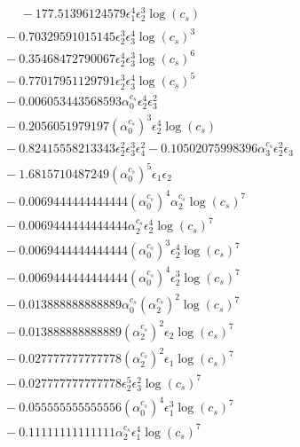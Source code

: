 \documentclass[10pt]{article}
\begin{document}
\begin{align*}
\phantom{F_{s,7}} &\phantom{={}}{}  - 177.51396124579 \epsilon_{1}^{4} \epsilon_{2}^{3} \log{\left(c_{s} \right)} \\
&{}  - 0.70329591015145 \epsilon_{2}^{3} \epsilon_{3}^{4} \log{\left(c_{s} \right)}^{3} \\
&{}  - 0.35468472790067 \epsilon_{2}^{4} \epsilon_{3}^{3} \log{\left(c_{s} \right)}^{6} \\
&{}  - 0.77017951129791 \epsilon_{2}^{3} \epsilon_{3}^{4} \log{\left(c_{s} \right)}^{5} \\
&{}  - 0.006053443568593 \alpha_{0}^{c_s} \epsilon_{2}^{4} \epsilon_{3}^{2} \\
&{}  - 0.2056051979197 \left(\alpha_{0}^{c_s}\right)^{3} \epsilon_{2}^{4} \log{\left(c_{s} \right)} \\
&{}  - 0.82415558213343 \epsilon_{2}^{2} \epsilon_{3}^{3} \epsilon_{4}^{2} - 0.10502075998396 \alpha_{3}^{c_s} \epsilon_{2}^{2} \epsilon_{3} \\
&{}  - 1.6815710487249 \left(\alpha_{0}^{c_s}\right)^{5} \epsilon_{1} \epsilon_{2} \\
&{}  - 0.0069444444444444 \left(\alpha_{0}^{c_s}\right)^{4} \alpha_{2}^{c_s} \log{\left(c_{s} \right)}^{7} \\
&{}  - 0.0069444444444444 \alpha_{2}^{c_s} \epsilon_{2}^{4} \log{\left(c_{s} \right)}^{7} \\
&{}  - 0.0069444444444444 \left(\alpha_{0}^{c_s}\right)^{3} \epsilon_{2}^{4} \log{\left(c_{s} \right)}^{7} \\
&{}  - 0.0069444444444444 \left(\alpha_{0}^{c_s}\right)^{4} \epsilon_{2}^{3} \log{\left(c_{s} \right)}^{7} \\
&{}  - 0.013888888888889 \alpha_{0}^{c_s} \left(\alpha_{2}^{c_s}\right)^{2} \log{\left(c_{s} \right)}^{7} \\
&{}  - 0.013888888888889 \left(\alpha_{2}^{c_s}\right)^{2} \epsilon_{2} \log{\left(c_{s} \right)}^{7} \\
&{}  - 0.027777777777778 \left(\alpha_{2}^{c_s}\right)^{2} \epsilon_{1} \log{\left(c_{s} \right)}^{7} \\
&{}  - 0.027777777777778 \epsilon_{2}^{5} \epsilon_{3}^{2} \log{\left(c_{s} \right)}^{7} \\
&{}  - 0.055555555555556 \left(\alpha_{0}^{c_s}\right)^{4} \epsilon_{1}^{3} \log{\left(c_{s} \right)}^{7} \\
&{}  - 0.11111111111111 \alpha_{2}^{c_s} \epsilon_{1}^{4} \log{\left(c_{s} \right)}^{7} \\

\end{align*}
\end{document}
